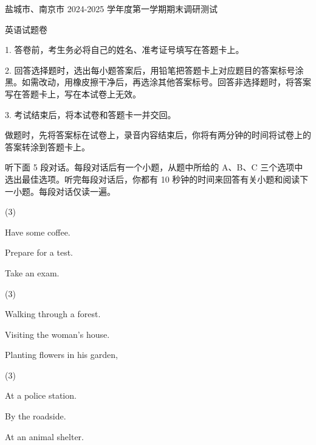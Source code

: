 \documentclass{英语试卷}
\begin{document}
\par 盐城市、南京市 2024-2025 学年度第一学期期末调研测试\par
\par 英语试题卷\par
\begin{notice}
\par 1. 答卷前，考生务必将自己的姓名、准考证号填写在答题卡上。\par
\par 2. 回答选择题时，选出每小题答案后，用铅笔把答题卡上对应题目的答案标号涂黑。如需改动，用橡皮擦干净后，再选涂其他答案标号。回答非选择题时，将答案写在答题卡上，写在本试卷上无效。\par
\par 3. 考试结束后，将本试卷和答题卡一并交回。\par
\end{notice}
\par 做题时，先将答案标在试卷上，录音内容结束后，你将有两分钟的时间将试卷上的答案转涂到答题卡上。\par
{}
\par 听下面 5 段对话。每段对话后有一个小题，从题中所给的 A、B、C 三个选项中选出最佳选项。听完每段对话后，你都有 10 秒钟的时间来回答有关小题和阅读下一小题。每段对话仅读一遍。\par
{}
\begin{choices}(3)
  \item Have some coffee.
  \item Prepare for a test.
  \item Take an exam.
\end{choices}
\begin{choices}(3)
  \item Walking through a forest.
  \item Visiting the woman's house.
  \item Planting flowers in his garden,
\end{choices}
\begin{choices}(3)
  \item At a police station.
  \item By the roadside.
  \item At an animal shelter.
\end{choices}
\end{document}
